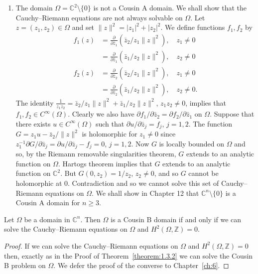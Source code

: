 \begin{enumerate}
This example can be generalised in the following way: We say that $\Omega\subset\mathbb C^n$ is a \emph{Runge domain} if polynomials are dense in $A(\Omega)$. It may be proved, using an ingenious inductive argument due to Oka, that the Cauchy--Riemann equations may always be solved on a Runge domain. For further details and references we refer the reader to H\"ormander \cite{bib:I:hormander-l:1}, Gunning and Rossi \cite{bib:I:gunning-r-c-and-rossi-h:1}.
\item The domain $\Omega=\mathbb C^2\setminus\{0\}$ is not a Cousin A domain. We shall show that the Cauchy--Riemann equations are not always solvable on $\Omega$. Let $z=(z_1,z_2)\in\Omega$ and set $\|z\|^2=|z_1|^2+|z_2|^2$. We define functions $f_1,f_2$ by
\begin{align*}
f_1(z)&=\frac{\partial}{\partial\bar z_1}(\bar z_2/z_1\|z\|^2),\quad z_1\neq0\\
&=\frac{\partial}{\partial\bar z_1}(\bar z_1/z_2\|z\|^2),\quad z_2\neq0\\
f_2(z)&=\frac{\partial}{\partial\bar z_2}(\bar z_2/z_1\|z\|^2),\quad z_1\neq0\\
&=\frac{\partial}{\partial\bar z_2}(\bar z_1/z_2\|z\|^2),\quad z_2\neq0.
\end{align*}
The identity $\frac1{z_1z_2}=\bar z_2/z_1\|z\|^2+\bar z_1/z_2\|z\|^2$, $z_1z_2\neq0$, implies that $f_1,f_2\in C^\infty(\Omega)$. Clearly we also have $\partial f_1/\partial\bar z_2=\partial f_2/\partial\bar z_1$ on $\Omega$. Suppose that there exists $u\in C^\infty(\Omega)$ such that $\partial u/\partial\bar z_j=f_j$, $j=1,2$. The function $G=z_1u-\bar z_2/\|z\|^2$ is holomorphic for $z_1\neq0$ since $z_1^{-1}\partial G/\partial\bar z_j=\partial u/\partial\bar z_j-f_j=0$, $j=1,2$. Now $G$ is locally bounded on $\Omega$ and so, by the Riemann removable singularities theorem, $G$ extends to an analytic function on $\Omega$. Hartogs theorem implies that $G$ extends to an analytic function on $\mathbb C^2$. But $G(0,z_2)=1/z_2$, $z_2\neq0$, and so $G$ cannot be holomorphic at 0. Contradiction and so we cannot solve this set of Cauchy--Riemann equations on $\Omega$. We shall show in Chapter 12 that $\mathbb C^n\setminus\{0\}$ is a Cousin A domain for $n\geq3$.
\end{enumerate}
 Let $\Omega$ be a domain in $\mathbb C^n$. Then $\Omega$ is a Cousin B domain if and only if we can solve the Cauchy--Riemann equations on $\Omega$ and $H^2(\Omega,\mathbb Z)=0$.
\begin{proof}
If we can solve the Cauchy--Riemann equations on $\Omega$ and $H^2(\Omega,\mathbb Z)=0$ then, exactly as in the Proof of Theorem~\ref{theorem:1.3.2} we can solve the Cousin B problem on $\Omega$. We defer the proof of the converse to Chapter~\ref{ch:6}.
\end{proof}
